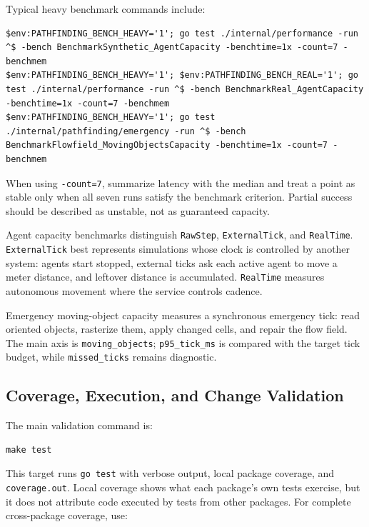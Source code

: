 \documentclass[12pt,a4paper]{report}
\begin{document}
Typical heavy benchmark commands include:

\begin{Verbatim}[breaklines=true,fontsize=\small]
$env:PATHFINDING_BENCH_HEAVY='1'; go test ./internal/performance -run ^$ -bench BenchmarkSynthetic_AgentCapacity -benchtime=1x -count=7 -benchmem
$env:PATHFINDING_BENCH_HEAVY='1'; $env:PATHFINDING_BENCH_REAL='1'; go test ./internal/performance -run ^$ -bench BenchmarkReal_AgentCapacity -benchtime=1x -count=7 -benchmem
$env:PATHFINDING_BENCH_HEAVY='1'; go test ./internal/pathfinding/emergency -run ^$ -bench BenchmarkFlowfield_MovingObjectsCapacity -benchtime=1x -count=7 -benchmem
\end{Verbatim}

When using \texttt{-count=7}, summarize latency with the median and treat a point
as stable only when all seven runs satisfy the benchmark criterion. Partial
success should be described as unstable, not as guaranteed capacity.

Agent capacity benchmarks distinguish \texttt{RawStep}, \texttt{ExternalTick},
and \texttt{RealTime}. \newline \texttt{ExternalTick} best represents simulations whose
clock is controlled by another system: agents start stopped, external ticks ask
each active agent to move a meter distance, and leftover distance is accumulated.
\texttt{RealTime} measures autonomous movement where the service controls
cadence.

Emergency moving-object capacity measures a synchronous emergency tick: read
oriented objects, rasterize them, apply changed cells, and repair the flow field.
The main axis is \texttt{moving\_objects}; \texttt{p95\_tick\_ms} is compared
with the target tick budget, while \texttt{missed\_ticks} remains diagnostic.

\subsection{Coverage, Execution, and Change Validation}

The main validation command is:

\begin{lstlisting}
make test
\end{lstlisting}

This target runs \texttt{go test} with verbose output, local package coverage,
and \texttt{coverage.out}. Local coverage shows what each package's own tests
exercise, but it does not attribute code executed by tests from other packages.
For complete cross-package coverage, use:
\end{document}
